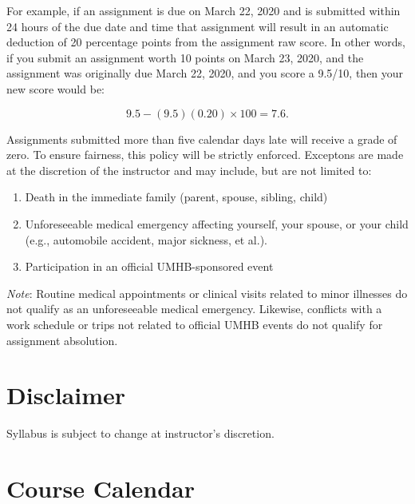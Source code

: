 \documentclass[
]{article}
\providecommand{\tightlist}{%
  \setlength{\itemsep}{0pt}\setlength{\parskip}{0pt}}
\begin{document}
For example, if an assignment is due on March 22, 2020 and is submitted
within 24 hours of the due date and time that assignment will result in
an automatic deduction of 20 percentage points from the assignment raw
score. In other words, if you submit an assignment worth 10 points on
March 23, 2020, and the assignment was originally due March 22, 2020,
and you score a 9.5/10, then your new score would be:

\begin{equation}
9.5 - (9.5)(0.20) \times 100 = 7.6.
\end{equation}

Assignments submitted more than five calendar days late will receive a
grade of zero. To ensure fairness, this policy will be strictly
enforced. Exceptons are made at the discretion of the instructor and may
include, but are not limited to:

\begin{enumerate}
\def\labelenumi{\arabic{enumi}.}
\tightlist
\item
  Death in the immediate family (parent, spouse, sibling, child)
\item
  Unforeseeable medical emergency affecting yourself, your spouse, or
  your child (e.g., automobile accident, major sickness, et al.).
\item
  Participation in an official UMHB-sponsored event
\end{enumerate}

\emph{Note}: Routine medical appointments or clinical visits related to
minor illnesses do not qualify as an unforeseeable medical emergency.
Likewise, conflicts with a work schedule or trips not related to
official UMHB events do not qualify for assignment absolution.

\section{Disclaimer}

Syllabus is subject to change at instructor's discretion.

\newpage

\section{Course Calendar}
\end{document}
